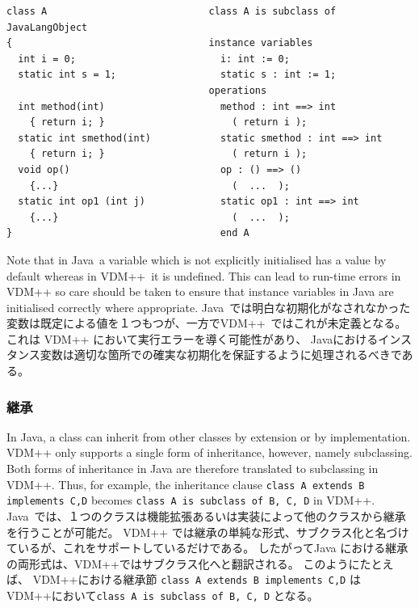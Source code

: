 \documentclass[\pformat,12pt]{jarticle}
\newcommand{\JAVA}{Java}
\newcommand{\VDM}{VDM++}
\begin{document}
\begin{small}
\begin{verbatim}
class A                            class A is subclass of JavaLangObject
{                                  instance variables
  int i = 0;                         i: int := 0;
  static int s = 1;                  static s : int := 1;
                                   operations
  int method(int)                    method : int ==> int
    { return i; }                      ( return i );
  static int smethod(int)            static smethod : int ==> int
    { return i; }                      ( return i );
  void op()                          op : () ==> ()
    {...}                              (  ...  );
  static int op1 (int j)             static op1 : int ==> int
    {...}                              (  ...  );
}                                    end A
\end{verbatim}
\end{small}

Note that in \JAVA\ a variable which is not explicitly initialised has
a value by default whereas in \VDM\ it is undefined. This can lead to
run-time errors in VDM++ so care should be taken to ensure that
instance variables in Java are initialised correctly where appropriate.
 \JAVA\ では明白な初期化がなされなかった変数は既定による値を１つもつが、一方で\VDM\ ではこれが未定義となる。
これは VDM++ において実行エラーを導く可能性があり、 Javaにおけるインスタンス変数は適切な箇所での確実な初期化を保証するように処理されるべきである。


\subsubsection{継承}\label{inheritance}

In \JAVA{}, a class can inherit from other classes by extension or by
implementation. VDM++ only supports a single form of inheritance,
however, namely subclassing. Both forms of inheritance in Java are 
therefore translated to subclassing in VDM++. Thus, for example, the
inheritance clause \texttt{class A extends B implements C,D} becomes
\texttt{class A is subclass of B, C, D} in VDM++.
 \JAVA\ では、１つのクラスは機能拡張あるいは実装によって他のクラスから継承を行うことが可能だ。
VDM++ では継承の単純な形式、サブクラス化と名づけているが、これをサポートしているだけである。
したがってJava における継承の両形式は、VDM++ではサブクラス化へと翻訳される。
このようにたとえば、 VDM++における継承節 \texttt{class A extends B implements C,D} は VDM++において\texttt{class A is subclass of B, C, D} となる。
\end{document}
